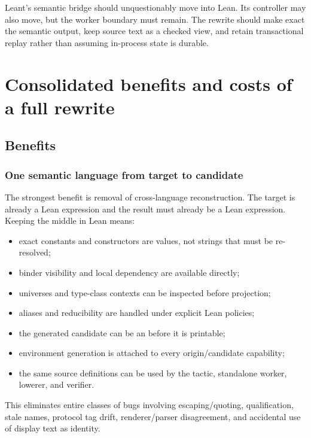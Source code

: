 \documentclass[10pt,letterpaper,oneside]{report}
\newcommand{\code}[1]{\texttt{\detokenize{#1}}}
\begin{document}
\begin{summarybox}
Leant's semantic bridge should unquestionably move into Lean. Its controller may also move, but the worker boundary must remain. The rewrite should make exact \code{Expr} the semantic output, keep source text as a checked view, and retain transactional replay rather than assuming in-process state is durable.
\end{summarybox}

\chapter{Consolidated benefits and costs of a full rewrite}\label{ch:pros-cons}

\section{Benefits}

\subsection{One semantic language from target to candidate}

The strongest benefit is removal of cross-language reconstruction. The target is already a Lean expression and the result must already be a Lean expression. Keeping the middle in Lean means:

\begin{itemize}
  \item exact constants and constructors are \code{Name} values, not strings that must be re-resolved;
  \item binder visibility and local dependency are available directly;
  \item universes and type-class contexts can be inspected before projection;
  \item aliases and reducibility are handled under explicit Lean policies;
  \item the generated candidate can be an \code{Expr} before it is printable;
  \item environment generation is attached to every origin/candidate capability;
  \item the same source definitions can be used by the tactic, standalone worker, lowerer, and verifier.
\end{itemize}

This eliminates entire classes of bugs involving escaping/quoting, qualification, stale names, protocol tag drift, renderer/parser disagreement, and accidental use of display text as identity.
\end{document}
